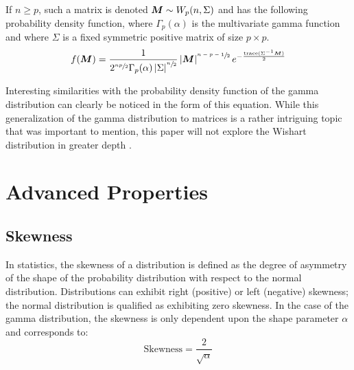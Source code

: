\documentclass[12pt]{article}
\begin{document}
If $n\geq p$, such a matrix is denoted $\bm{M}\sim W_p(n, \Sigma)$ and has the following probability density function,
where $\Gamma_p(\alpha)$ is the multivariate gamma function and where $\Sigma$ is a fixed symmetric positive matrix of
size $p \times p$.
\begin{equation}
	f(\bm{M}) = \frac{1}{2^{\sfrac{np}{2}}\Gamma_p(\alpha)\left|\Sigma\right|^{\sfrac{n}{2}}}\left|\bm{M}\right|^{\sfrac{n-p-1}{2}}e^{-\frac{\text{trace}(\Sigma^{-1}\bm{M})}{2}}
\end{equation}

Interesting similarities with the probability density function of the gamma distribution can clearly be noticed in the
form of this equation. While this generalization of the gamma distribution to matrices is a rather intriguing topic that
was important to mention, this paper will not explore the Wishart distribution in greater depth
\cite{wikipediaWishartDistribution2022}.


\pagebreak
\section{Advanced Properties}
\subsection{Skewness}
In statistics, the skewness of a distribution is defined as the degree of asymmetry of the shape of the probability
distribution with respect to the normal distribution. Distributions can exhibit right (positive) or left (negative)
skewness; the normal distribution is qualified as exhibiting zero skewness. In the case of the gamma distribution, the
skewness is only dependent upon the shape parameter $\alpha$ and corresponds to\cite{chenLearnSkewness2021,
wikipediaGammaDistribution2022}:
\begin{equation}
	\text{Skewness} = \frac{2}{\sqrt{\alpha}}
\end{equation}
\end{document}
